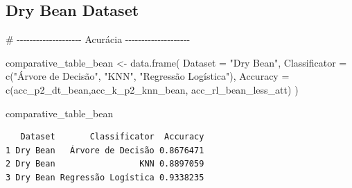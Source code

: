 \documentclass[
  letterpaper,
  DIV=11,
  numbers=noendperiod]{scrartcl}
\newenvironment{Shaded}{\begin{snugshade}}{\end{snugshade}}
\newcommand{\AttributeTok}[1]{\textcolor[rgb]{0.40,0.45,0.13}{#1}}
\newcommand{\CommentTok}[1]{\textcolor[rgb]{0.37,0.37,0.37}{#1}}
\newcommand{\FunctionTok}[1]{\textcolor[rgb]{0.28,0.35,0.67}{#1}}
\newcommand{\NormalTok}[1]{\textcolor[rgb]{0.00,0.23,0.31}{#1}}
\newcommand{\OtherTok}[1]{\textcolor[rgb]{0.00,0.23,0.31}{#1}}
\newcommand{\StringTok}[1]{\textcolor[rgb]{0.13,0.47,0.30}{#1}}
\begin{document}
\subsection{Dry Bean Dataset}\label{dry-bean-dataset-2}

\begin{Shaded}
\begin{Highlighting}[]
\CommentTok{\# {-}{-}{-}{-}{-}{-}{-}{-}{-}{-}{-}{-}{-}{-}{-}{-}{-}{-}{-}{-} Acurácia {-}{-}{-}{-}{-}{-}{-}{-}{-}{-}{-}{-}{-}{-}{-}{-}{-}{-}{-}{-}}

\NormalTok{comparative\_table\_bean }\OtherTok{\textless{}{-}} \FunctionTok{data.frame}\NormalTok{(}
  \AttributeTok{Dataset =} \StringTok{"Dry Bean"}\NormalTok{,}
  \AttributeTok{Classificator =} \FunctionTok{c}\NormalTok{(}\StringTok{"Árvore de Decisão"}\NormalTok{, }\StringTok{"KNN"}\NormalTok{, }\StringTok{"Regressão Logística"}\NormalTok{),}
  \AttributeTok{Accuracy =} \FunctionTok{c}\NormalTok{(acc\_p2\_dt\_bean,acc\_k\_p2\_knn\_bean, acc\_rl\_bean\_less\_att)}
\NormalTok{)}

\NormalTok{comparative\_table\_bean}
\end{Highlighting}
\end{Shaded}

\begin{verbatim}
   Dataset       Classificator  Accuracy
1 Dry Bean   Árvore de Decisão 0.8676471
2 Dry Bean                 KNN 0.8897059
3 Dry Bean Regressão Logística 0.9338235
\end{verbatim}
\end{document}
